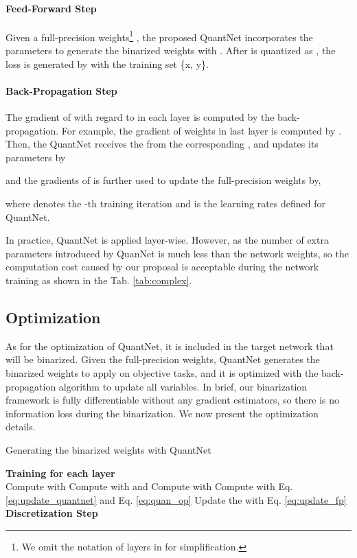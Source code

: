 \documentclass[runningheads]{llncs}
\begin{document}
\paragraph{\textbf{Feed-Forward Step}}
Given a full-precision weights\footnote{We omit the notation of layers  in  for simplification.} ,
the proposed QuantNet  incorporates the parameters 
to generate the binarized weights  with .
After  is quantized as , the loss  is generated by  with the training set \{x, y\}.

\paragraph{\textbf{Back-Propagation Step}}
The gradient of  with regard to  in each layer is computed by the back-propagation.
For example, the gradient of weights  in last layer is computed by .
Then, the QuantNet  receives the  from the corresponding ,
and updates its parameters  by



and the gradients of  is further used to update the full-precision weights  by,



where  denotes the -th training iteration and  is the learning rates defined for QuantNet.

In practice, QuantNet is applied layer-wise.
However, as the number of extra parameters introduced by QuanNet is much less than the network weights,
so the computation cost caused by our proposal is acceptable during the network training as shown in the Tab. \ref{tab:complex}.

\subsection{Optimization}
As for the optimization of QuantNet,
it is included in the target network that will be binarized.
Given the full-precision weights, QuantNet generates the binarized weights to apply on objective tasks,
and it is optimized with the back-propagation algorithm to update all variables.
In brief, our binarization framework is fully differentiable without any gradient estimators,
so there is no information loss during the binarization.
We now present the optimization details.

\begin{algorithm}[t] \label{alg:op}
  \caption{Generating the binarized weights with QuantNet}
  \textbf{Training for each layer}\\
  \For{}
  {
    \;
    \quad Compute  with \;
    \quad Compute  with  and \;
    \;
    \quad Compute  with \;
    \quad Compute  with Eq. \ref{eq:update_quantnet} and Eq. \ref{eq:quan_op}\;
    \quad Update the  with Eq. \ref{eq:update_fp}\;
}
  \textbf{Discretization Step}\\
  \;
\end{algorithm}
\end{document}
